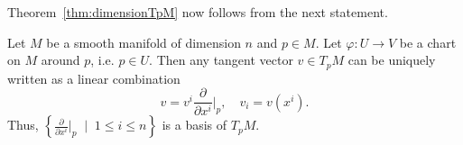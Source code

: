Theorem~\ref{thm:dimensionTpM} now follows from the next statement.

\begin{proposition}\label{prop:basis_TpM}
  Let $M$ be a smooth manifold of dimension $n$ and $p\in M$.
  Let $\varphi: U \to V$ be a chart on $M$ around $p$, i.e. $p\in U$.
  Then any tangent vector $v\in T_p M$ can be uniquely written as a linear combination
  \begin{equation}
    v = v^i \frac{\partial}{\partial x^i}\Big|_p, \quad v_i = v(x^i).
  \end{equation}
  Thus, $\left\{\frac{\partial}{\partial x^i}\Big|_p\;\mid\; 1\leq i\leq n\right\}$ is a basis of $T_p M$.
\end{proposition}

